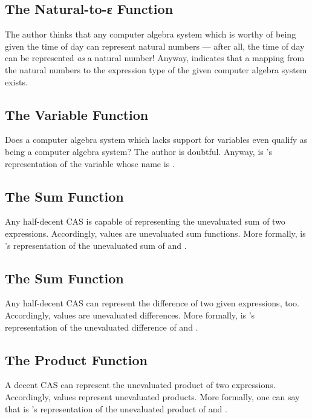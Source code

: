 \documentclass{report}
\begin{document}
\subsection{The Natural-to-ε Function}
The author thinks that any computer algebra system which is worthy of being given the time of day can represent natural numbers --- after all, the time of day can be represented \emph{as} a natural number!  Anyway,  indicates that a mapping from the natural numbers to the expression type of the given computer algebra system exists.

\subsection{The Variable Function}
Does a computer algebra system which lacks support for variables even qualify as being a computer algebra system?  The author is doubtful.  Anyway,    is 's representation of the variable whose name is .

\subsection{The Sum Function}
Any half-decent CAS is capable of representing the unevaluated sum of two expressions.  Accordingly,  values are unevaluated sum functions.  More formally,     is 's representation of the unevaluated sum of  and .

\subsection{The Sum Function}
Any half-decent CAS can represent the difference of two given expressions, too.  Accordingly,  values are unevaluated differences.  More formally,     is 's representation of the unevaluated difference of  and .

\subsection{The Product Function}
A decent CAS can represent the unevaluated product of two expressions.  Accordingly,  values represent unevaluated products.  More formally, one can say that     is 's representation of the unevaluated product of  and .
\end{document}
